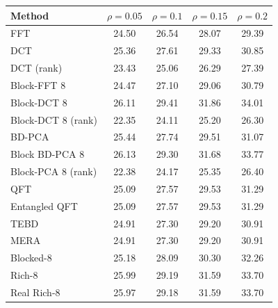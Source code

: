 %
\begin{tabular}{lcccc}
\toprule
Method & $\rho=0.05$ & $\rho=0.1$ & $\rho=0.15$ & $\rho=0.2$ \\
\midrule
FFT & 24.50 & 26.54 & 28.07 & 29.39 \\
DCT & 25.36 & 27.61 & 29.33 & 30.85 \\
DCT (rank) & 23.43 & 25.06 & 26.29 & 27.39 \\
Block-FFT 8 & 24.47 & 27.10 & 29.06 & 30.79 \\
Block-DCT 8 & 26.11 & 29.41 & 31.86 & 34.01 \\
Block-DCT 8 (rank) & 22.35 & 24.11 & 25.20 & 26.30 \\
\midrule
BD-PCA & 25.44 & 27.74 & 29.51 & 31.07 \\
Block BD-PCA 8 & 26.13 & 29.30 & 31.68 & 33.77 \\
Block-PCA 8 (rank) & 22.38 & 24.17 & 25.35 & 26.40 \\
\midrule
QFT & 25.09 & 27.57 & 29.53 & 31.29 \\
Entangled QFT & 25.09 & 27.57 & 29.53 & 31.29 \\
TEBD & 24.91 & 27.30 & 29.20 & 30.91 \\
MERA & 24.91 & 27.30 & 29.20 & 30.91 \\
\midrule
Blocked-8 & 25.18 & 28.09 & 30.30 & 32.26 \\
Rich-8 & 25.99 & 29.19 & 31.59 & 33.70 \\
Real Rich-8 & 25.97 & 29.18 & 31.59 & 33.70 \\
\bottomrule
\end{tabular}
